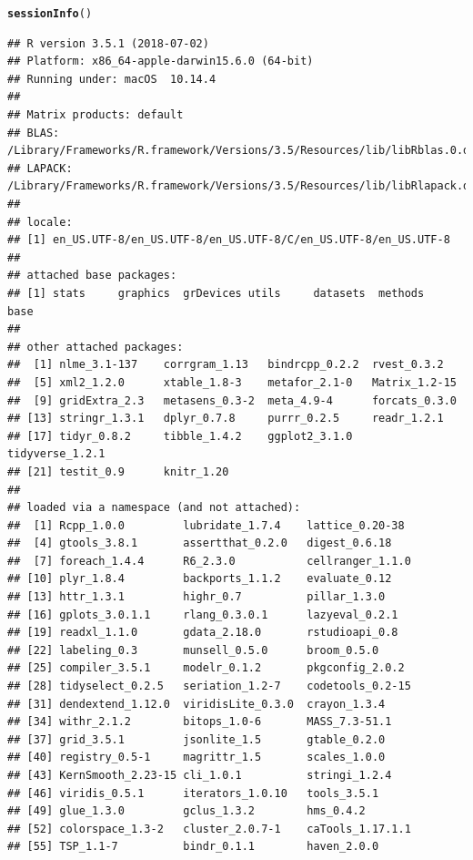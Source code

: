\documentclass[11pt,a4paper,twoside]{book}\usepackage[]{graphicx}\usepackage[]{color}
\makeatletter
\newcommand{\hlstd}[1]{\textcolor[rgb]{0.345,0.345,0.345}{#1}}%
\newcommand{\hlkwd}[1]{\textcolor[rgb]{0.737,0.353,0.396}{\textbf{#1}}}%
\newenvironment{kframe}{%
 \def\at@end@of@kframe{}%
 \ifinner\ifhmode%
  \def\at@end@of@kframe{\end{minipage}}%
  \begin{minipage}{\columnwidth}%
 \fi\fi%
 \def\FrameCommand##1{\hskip\@totalleftmargin \hskip-\fboxsep
 \colorbox{shadecolor}{##1}\hskip-\fboxsep
     \hskip-\linewidth \hskip-\@totalleftmargin \hskip\columnwidth}%
 \MakeFramed {\advance\hsize-\width
   \@totalleftmargin\z@ \linewidth\hsize
   \@setminipage}}%
 {\par\unskip\endMakeFramed%
 \at@end@of@kframe}
\newenvironment{knitrout}{}{} %
\makeatother
\begin{document}
\begin{knitrout}
\color{fgcolor}\begin{kframe}
\begin{alltt}
\hlkwd{sessionInfo}\hlstd{()}
\end{alltt}
\begin{verbatim}
## R version 3.5.1 (2018-07-02)
## Platform: x86_64-apple-darwin15.6.0 (64-bit)
## Running under: macOS  10.14.4
## 
## Matrix products: default
## BLAS: /Library/Frameworks/R.framework/Versions/3.5/Resources/lib/libRblas.0.dylib
## LAPACK: /Library/Frameworks/R.framework/Versions/3.5/Resources/lib/libRlapack.dylib
## 
## locale:
## [1] en_US.UTF-8/en_US.UTF-8/en_US.UTF-8/C/en_US.UTF-8/en_US.UTF-8
## 
## attached base packages:
## [1] stats     graphics  grDevices utils     datasets  methods   base     
## 
## other attached packages:
##  [1] nlme_3.1-137    corrgram_1.13   bindrcpp_0.2.2  rvest_0.3.2    
##  [5] xml2_1.2.0      xtable_1.8-3    metafor_2.1-0   Matrix_1.2-15  
##  [9] gridExtra_2.3   metasens_0.3-2  meta_4.9-4      forcats_0.3.0  
## [13] stringr_1.3.1   dplyr_0.7.8     purrr_0.2.5     readr_1.2.1    
## [17] tidyr_0.8.2     tibble_1.4.2    ggplot2_3.1.0   tidyverse_1.2.1
## [21] testit_0.9      knitr_1.20     
## 
## loaded via a namespace (and not attached):
##  [1] Rcpp_1.0.0         lubridate_1.7.4    lattice_0.20-38   
##  [4] gtools_3.8.1       assertthat_0.2.0   digest_0.6.18     
##  [7] foreach_1.4.4      R6_2.3.0           cellranger_1.1.0  
## [10] plyr_1.8.4         backports_1.1.2    evaluate_0.12     
## [13] httr_1.3.1         highr_0.7          pillar_1.3.0      
## [16] gplots_3.0.1.1     rlang_0.3.0.1      lazyeval_0.2.1    
## [19] readxl_1.1.0       gdata_2.18.0       rstudioapi_0.8    
## [22] labeling_0.3       munsell_0.5.0      broom_0.5.0       
## [25] compiler_3.5.1     modelr_0.1.2       pkgconfig_2.0.2   
## [28] tidyselect_0.2.5   seriation_1.2-7    codetools_0.2-15  
## [31] dendextend_1.12.0  viridisLite_0.3.0  crayon_1.3.4      
## [34] withr_2.1.2        bitops_1.0-6       MASS_7.3-51.1     
## [37] grid_3.5.1         jsonlite_1.5       gtable_0.2.0      
## [40] registry_0.5-1     magrittr_1.5       scales_1.0.0      
## [43] KernSmooth_2.23-15 cli_1.0.1          stringi_1.2.4     
## [46] viridis_0.5.1      iterators_1.0.10   tools_3.5.1       
## [49] glue_1.3.0         gclus_1.3.2        hms_0.4.2         
## [52] colorspace_1.3-2   cluster_2.0.7-1    caTools_1.17.1.1  
## [55] TSP_1.1-7          bindr_0.1.1        haven_2.0.0
\end{verbatim}
\end{kframe}
\end{knitrout}
\end{document}
